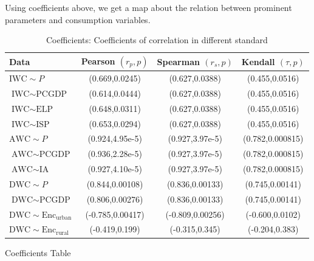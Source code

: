     Using coefficients above, we get a map about the relation between prominent parameters and consumption variables.

    \begin{table}[!htb]
      \label{tab: coefficients}
      \centering
      \begin{tabular}{l||c|c|c}
      \hline
      Data                & Pearson $(r_p,p)$                        & Spearman $(r_s,p)$       & Kendall $(\tau, p)$ \\
      \hline

      $\text{IWC}\sim P$ & (0.669,0.0245)                   &(0.627,0.0388)   &(0.455,0.0516) \\
      \hline
      $\text{IWC}\sim \text{PCGDP}$ &(0.614,0.0444)         &(0.627,0.0388)   &(0.455,0.0516) \\
      \hline
      $\text{IWC}\sim \text{ELP}$ &(0.648,0.0311)           &(0.627,0.0388)   &(0.455,0.0516) \\
      \hline
      $\text{IWC}\sim \text{ISP}$ &(0.653,0.0294)           &(0.627,0.0388)   &(0.455,0.0516) \\
      \hline\hline
      $\text{AWC}\sim P$ &(0.924,4.95e-5)                   &(0.927,3.97e-5)  &(0.782,0.000815) \\
      \hline
      $\text{AWC}\sim \text{PCGDP}$ &(0.936,2.28e-5)        &(0.927,3.97e-5)  &(0.782,0.000815) \\
      \hline
      $\text{AWC}\sim \text{IA}$ &(0.927,4.10e-5)           &(0.927,3.97e-5)  &(0.782,0.000815) \\
      \hline\hline
      $\text{DWC}\sim P$ &(0.844,0.00108)                   &(0.836,0.00133)  &(0.745,0.00141) \\
      \hline
      $\text{DWC}\sim \text{PCGDP}$ &(0.806,0.00276)        &(0.836,0.00133)  &(0.745,0.00141) \\
      \hline
      $\text{DWC}\sim \text{Enc}_\text{urban}$ &(-0.785,0.00417) &(-0.809,0.00256) &(-0.600,0.0102) \\
      \hline
      $\text{DWC}\sim \text{Enc}_\text{rural}$ &(-0.419,0.199)   &(-0.315,0.345)   &(-0.204,0.383) \\
      \hline

      \end{tabular}
      \caption{Coefficients: Coefficients of correlation in different standard}
    \end{table}

    {\huge Coefficients Table}

